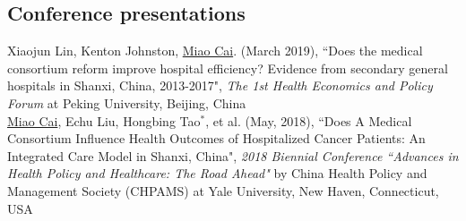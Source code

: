 \documentclass[11pt, a4paper]{article}
\newcommand{\years}[1]{\marginnote{\scriptsize #1}}
\begin{document}
\subsection*{Conference presentations}
\noindent
\years{2019}Xiaojun Lin, Kenton Johnston, \underline{Miao Cai}. (March 2019), ``Does the medical consortium reform improve hospital efficiency? Evidence from secondary general hospitals in Shanxi, China, 2013-2017", \emph{The 1st Health Economics and Policy Forum} at Peking University, Beijing, China\\
\years{2018}\underline{Miao Cai}, Echu Liu, Hongbing Tao$^\ast$, et al. (May, 2018), ``Does A Medical Consortium Influence Health Outcomes of Hospitalized Cancer Patients: An Integrated Care Model in Shanxi, China", \emph{2018 Biennial Conference ``Advances in Health Policy and Healthcare: The Road Ahead"} by China Health Policy and Management Society (CHPAMS) at Yale University, New Haven, Connecticut, USA
\end{document}
